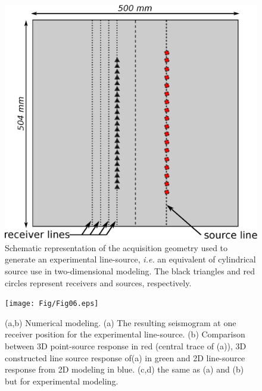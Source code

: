 \documentclass[extra,mreferee]{gji}
\begin{document}
\clearpage
\newpage

\begin{figure}
\centering
\includegraphics[width=0.50\columnwidth]{Fig/Fig05.eps}
\caption{Schematic representation of the acquisition geometry used to generate an experimental line-source, \textit{i.e.} an equivalent of cylindrical source use in two-dimensional modeling. The black triangles and red circles represent receivers and sources, respectively.}
\label{Fig:Fig05}
\end{figure}

\clearpage
\newpage

\begin{figure}
\centering
\texttt{[image: Fig/Fig06.eps]}
\caption{(a,b) Numerical modeling. (a) The resulting seismogram at one receiver position for the experimental line-source. (b) Comparison between 3D point-source response in red (central trace of (a)), 3D constructed line source response of(a) in green and 2D line-source response from 2D modeling in blue. (c,d) the same as (a) and (b) but for experimental modeling.}
\label{Fig:Fig06}
\end{figure}

\clearpage
\newpage
\end{document}
